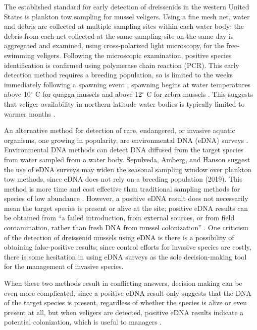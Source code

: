 \documentclass[12pt]{article}\usepackage[]{graphicx}\usepackage[]{color}
\begin{document}
The established standard for early detection of dreissenids in the western United States is plankton tow sampling for mussel veligers. Using a fine mesh net, water and debris are collected at multiple sampling sites within each water body; the debris from each net collected at the same sampling site on the same day is aggregated and examined, using cross-polarized light microscopy, for the free-swimming veligers. Following the microscopic examination, positive species identification is confirmed using polymerase chain reaction (PCR). This early detection method requires a breeding population, so is limited to the weeks immediately following a spawning event \cite{Nichols}; spawning begins at water temperatures above 10$^\circ$ C for quagga mussels and above 12$^\circ$ C for zebra mussels \cite{McMahon, Mills}. This suggests that veliger availability in northern latitude water bodies is typically limited to warmer months \cite{Sepulveda:eDNA}.

An alternative method for detection of rare, endangered, or invasive aquatic organisms, one growing in popularity, are environmental DNA (eDNA) surveys \cite{Schmelzle}. Environmental DNA methods can detect DNA diffused from the target species from water sampled from a water body. Sepulveda, Amberg, and Hanson suggest the use of eDNA surveys may widen the seasonal sampling window over plankton tow methods, since eDNA does not rely on a breeding population (2019). This method is more time and cost effective than traditional sampling methods for species of low abundance \cite{Rees}. However, a positive eDNA result does not necessarily mean the target species is present or alive at the site; positive eDNA results can be obtained from ``a failed introduction, from external sources, or from field contamination, rather than fresh DNA from mussel colonization'' \cite{Sepulveda:eDNA}. One criticism of the detection of dreissenid mussels using eDNA is there is a possibility of obtaining false-positive results; since control efforts for invasive species are costly, there is some hesitation in using eDNA surveys as the sole decision-making tool for the management of invasive species. 

When these two methods result in conflicting answers, decision making can be even more complicated, since a positive eDNA result only suggests that the DNA of the target species is present, regardless of whether the species is alive or even present at all, but when veligers are detected, positive eDNA results indicate a potential colonization, which is useful to managers \cite{Holser:body}.
\end{document}
